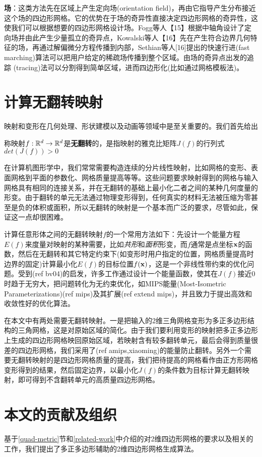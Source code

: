 \textbf{场}：这类方法先在区域上产生定向场(orientation field)，再由它指导产生分布接近这个场的四边形网格。它的优势在于场的奇异性直接决定四边形网格的奇异性，这使我们可以根据想要的四边形网格设计场。Fogg等人【15】根据中轴角设计了定向场并由此产生少量孤立的奇异点，Kowalski等人【16】先在产生符合边界几何特征的场，再通过解偏微分方程传播到内部，Sethian等人[16]提出的快速行进(fast marching)算法可以把用户给定的稀疏场传播到整个区域。由场的奇异点出发的追踪
(tracing)法可以分割得到简单区域，进而四边形化(比如通过网格模板法)。

\section{计算无翻转映射}\label{invertion-free}
映射和变形在几何处理、形状建模以及动画等领域中是至关重要的。我们首先给出
\begin{definition}\label{def:local-injective}
称映射$f:\mathbb{R}^d \rightarrow \mathbb{R}^d$是\textbf{无翻转}的，是指映射的雅克比矩阵$J(f)$的行列式$det(J(f))>0$
\end{definition}
在计算机图形学中，我们常常需要构造连续的分片线性映射，比如网格的变形、表面网格到平面的参数化、网格质量提高等等。这些问题要求映射得到的网格与输入网格具有相同的连接关系，并在无翻转的基础上最小化二者之间的某种几何度量的形变。由于翻转的单元无法通过物理变形得到，任何真实的材料无法被压缩为零甚至是负的体积或面积，所以无翻转的映射是一个基本而广泛的要求，尽管如此，保证这一点却很困难。

计算任意形体之间的无翻转映射$f$的一个常用方法如下：先设计一个能量方程$E(f)$来度量对映射的某种需要，比如\emph{共形}和\emph{面积}形变，而$f$通常是点坐标$\mathbf{x}$的函数，然后在无翻转和其它特定约束下(如变形时用户指定的位置，网格质量提高时边界的固定)计算最小化$E(f)$的目标位置$f(\mathbf{x})$，这是一个非线性带约束的优化问题。受到(ref bv04)的启发，许多工作通过设计一个能量函数，使其在$J(f)$接近0时趋于无穷大，把问题转化为无约束优化，如MIPS能量(Most-Isometric Parameterizations)(ref mips)及其扩展(ref extend mips)，并且致力于提出高效和收敛性好的优化算法。

在本文中有两处需要无翻转映射。一是把输入的2维三角网格变形为多正多边形结构的三角网格，这是对原始区域的简化。由于我们要利用变形的映射把多正多边形上生成的四边形网格映回原始区域，若映射含有较多翻转单元，最后会得到质量很差的四边形网格，我们采用了(ref amips,xiaoming)的能量防止翻转。另外一个需要无翻转映射的是四边形网格质量的提高，我们把待提高的网格看作由正方形网格变形得到的结果，然后固定边界，以最小化$J(f)$的条件数为目标计算无翻转映射，即可得到不含翻转单元的高质量四边形网格。


\section{本文的贡献及组织}\label{contri-organ}
基于\ref{quad-metric}节和\ref{related-work}中介绍的对2维四边形网格的要求以及相关的工作，我们提出了多正多边形辅助的2维四边形网格生成算法。%

